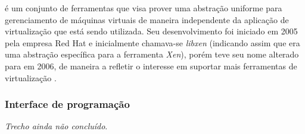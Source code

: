 \libvirt{} é um conjunto de ferramentas que visa prover uma abstração
uniforme para gerenciamento de máquinas virtuais de maneira independente 
da aplicação de virtualização que está sendo utilizada. Seu desenvolvimento
foi iniciado em 2005 pela empresa Red Hat e inicialmente chamava-se
\emph{libxen} (indicando assim que era uma abstração específica para a
ferramenta \emph{Xen}), porém teve seu nome alterado para \libvirt{} em
2006, de maneira a refletir o interesse em suportar mais ferramentas de
virtualização .

\subsubsection{Interface de programação}\label{sec:libvirtapi}

\emph{Trecho ainda não concluído}.
